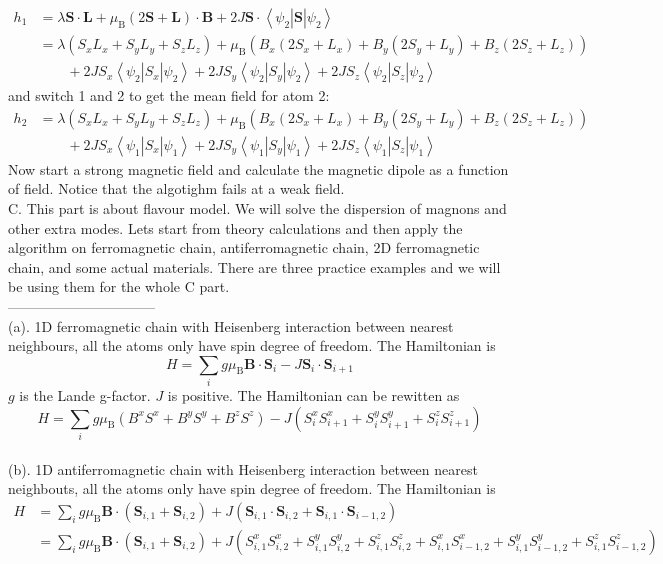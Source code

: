 \documentclass[letter]{article}
\begin{document}
$$\begin{aligned}
    h_1 &=\lambda \bm{S} \cdot \bm{L}+\mu_{\mathrm{B}} (2\bm{S}+\bm{L})\cdot \bm{B}+2J \bm{S}\cdot \left<\psi_2\right|\bm{S}\left|\psi_2 \right>\\
    &=\lambda \left(S_xL_x+S_y L_y+S_z L_z\right)+\mu_{\mathrm{B}}\left( B_x(2S_x+L_x)+B_y(2S_y+L_y)+B_z(2S_z+L_z) \right)\\&\ \ \ \ \ \ \ \ \ +2JS_x\left<\psi_2\right|S_x\left|\psi_2\right>+2JS_y\left<\psi_2\right|S_y\left|\psi_2\right>+2JS_z\left<\psi_2\right|S_z\left|\psi_2\right>
\end{aligned}
$$
and switch 1 and 2 to get the mean field for atom 2:
$$\begin{aligned}   
   h_2 &=\lambda \left(S_xL_x+S_y L_y+S_z L_z\right)+\mu_{\mathrm{B}}\left( B_x(2S_x+L_x)+B_y(2S_y+L_y)+B_z(2S_z+L_z) \right)\\&\ \ \ \ \ \ \ \ \ +2JS_x\left<\psi_1\right|S_x\left|\psi_1\right>+2JS_y\left<\psi_1\right|S_y\left|\psi_1\right>+2JS_z\left<\psi_1\right|S_z\left|\psi_1\right>
\end{aligned}
$$
Now start a strong magnetic field and calculate the magnetic dipole as a function of field. Notice that the algotighm fails at a weak field.\\
{\large{C}}. This part is about flavour model. We will solve the dispersion of magnons and other extra modes. Lets start from theory calculations and then apply the algorithm on ferromagnetic chain, antiferromagnetic chain, 2D ferromagnetic chain, and some actual materials. There are three practice examples and we will be using them for the whole C part.  \\
--------------------------------\\
\indent (a). 1D ferromagnetic chain with Heisenberg interaction between nearest neighbours, all the atoms only have spin degree of freedom. The Hamiltonian is $$
H=\sum_{i}g\mu_{\mathrm{B}}\bm{B}\cdot\bm{S}_i-J\bm{S}_{i}\cdot\bm{S}_{i+1}
$$
$g$ is the Lande  g-factor. $J$ is positive. The Hamiltonian can be rewitten as $$
H=\sum_{i}g\mu_{\mathrm{B}}(B^x S^x +B^y S^y+B^z S^z)-J(S_{i}^x S_{i+1}^x+S_{i}^y S_{i+1}^y+S_{i}^z S_{i+1}^z)
$$\\
\indent (b). 1D antiferromagnetic chain with Heisenberg interaction between nearest neighbouts, all the atoms only have spin degree of freedom. The Hamiltonian is $$
\begin{aligned}
    H&=\sum_i g\mu _{\mathrm{B}}\bm{B}\cdot(\bm{S}_{i,1}+\bm{S}_{i,2})+J(\bm{S}_{i,1}\cdot\bm{S}_{i,2}+\bm{S}_{i,1}\cdot\bm{S}_{i-1,2} )\\
   & =\sum_i g\mu _{\mathrm{B}}\bm{B}\cdot(\bm{S}_{i,1}+\bm{S}_{i,2})+J(S_{i,1}^x S_{i,2}^x+S_{i,1}^y S_{i,2}^y+S_{i,1}^z S_{i,2}^z+S_{i,1}^x S_{i-1,2}^x+S_{i,1}^y S_{i-1,2}^y+S_{i,1}^z S_{i-1,2}^z)
\end{aligned}
$$\\
\end{document}
